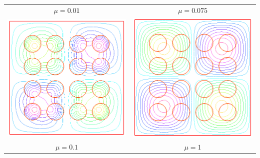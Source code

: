 \documentclass{article}
\begin{document}
\begin{center}
\begin{tabular}{cc}
	$\mu = 0.01$
	 & 
	 $\mu = 0.075$
	\\
  \includegraphics[scale=0.5]{img/q8-3.png}	
  &
  \includegraphics[scale=0.5]{img/q8-4.png}	
	\\
	
	$\mu = 0.1$
	 & 
	 $\mu = 1$
	\end{tabular}
\end{center}
\end{document}
